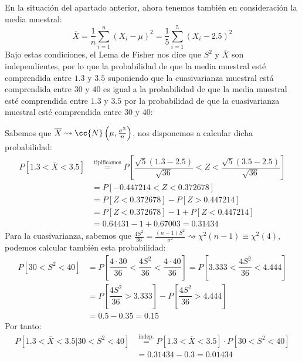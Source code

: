 \begin{ejercicio}
\begin{enumerate}[label=\alph*)]
            En la situación del apartado anterior, ahora tenemos también en consideración la media muestral:
            \begin{equation*}
                \overline{X} = \dfrac{1}{n}\sum_{i=1}^n {(X_i -\mu)}^{2} = \dfrac{1}{5}\sum_{i=1}^{5}{(X_i - 2.5)}^{2}
            \end{equation*}
            Bajo estas condiciones, el Lema de Fisher nos dice que $S^2$ y $\overline{X}$ son independientes, por lo que la probabilidad de que la media muestral esté comprendida entre $1.3$ y $3.5$ suponiendo que la cuasivarianza muestral está comprendida entre $30$ y $40$ es igual a la probabilidad de que la media muestral esté comprendida entre $1.3$ y $3.5$ por la probabilidad de que la cuasivarianza muestral esté comprendida entre $30$ y $40$:

            Sabemos que $\overline{X}\rightsquigarrow\cc{N}\left(\mu, \frac{\sigma^2}{n}\right)$, nos disponemos a calcular dicha probabilidad:
            \begin{align*}
                P[1.3<\overline{X}<3.5] &\stackrel{\text{tipificamos}}{=} P\left[\dfrac{\sqrt{5}(1.3-2.5)}{\sqrt{36}}< Z < \dfrac{\sqrt{5}(3.5-2.5)}{\sqrt{36}}\right] \\
                                        &= P[-0.447214 < Z < 0.372678] \\ 
                                        &= P[Z<0.372678] - P[Z>0.447214] \\
                                        &= P[Z<0.372678] -1 + P[Z<0.447214] \\
                                        &= 0.64431 - 1 + 0.67003 = 0.31434
            \end{align*}
            Para la cuasivarianza, sabemos que $\frac{4S^2}{36} = \frac{(n-1)S^2}{\sigma^2}\rightsquigarrow\chi^2(n-1) \equiv \chi^2(4)$, podemos calcular también esta probabilidad:
            \begin{align*}
                P[30<S^2<40] &= P\left[\dfrac{4\cdot 30}{36}<\dfrac{4S^2}{36}<\dfrac{4\cdot 40}{36}\right] = P\left[3.333 < \dfrac{4S^2}{36}<4.444\right] \\
                             &= P\left[\dfrac{4S^2}{36}>3.333\right] - P\left[\dfrac{4S^2}{36}>4.444\right] \\
                             &= 0.5 - 0.35 = 0.15
            \end{align*}
            Por tanto:
            \begin{align*}
                P[1.3 < \overline{X}<3.5 | 30<S^2<40] &\stackrel{\text{indep.}}{=} P[1.3<\overline{X}<3.5]\cdot P[30<S^2<40] \\ &= 0.31434 - 0.3 = 0.01434
            \end{align*}
    \end{enumerate}
\end{ejercicio}

